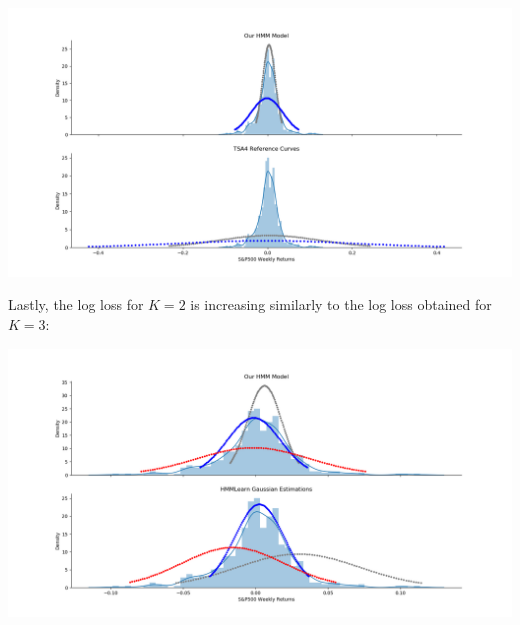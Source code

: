 \documentclass[12pt]{article}
\begin{document}
\begin{center}
	\includegraphics[width=1\linewidth]{figures/problem-3-6.png} 
\end{center}

Lastly, the log loss for $K=2$ is increasing similarly to the log loss obtained for $K=3$:

\begin{center}
	\includegraphics[width=1\linewidth]{figures/problem-3-4.png} 
\end{center}
\end{document}
